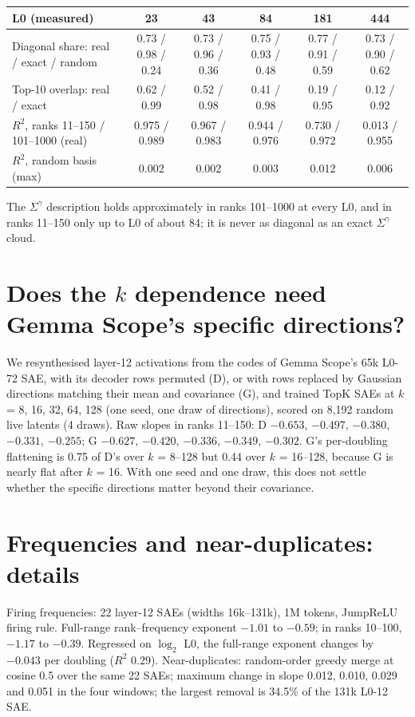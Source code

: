 \documentclass[10pt,twocolumn]{article}
\newcommand{\gam}{\gamma}
\begin{document}
\begin{center}
\small
\begin{tabular}{lccccc}
\toprule
L0 (measured) & 23 & 43 & 84 & 181 & 444 \\
\midrule
Diagonal share: real / exact / random & 0.73 / 0.98 / 0.24 & 0.73 / 0.96 / 0.36 & 0.75 / 0.93 / 0.48 & 0.77 / 0.91 / 0.59 & 0.73 / 0.90 / 0.62 \\
Top-10 overlap: real / exact & 0.62 / 0.99 & 0.52 / 0.98 & 0.41 / 0.98 & 0.19 / 0.95 & 0.12 / 0.92 \\
$R^2$, ranks 11--150 / 101--1000 (real) & 0.975 / 0.989 & 0.967 / 0.983 & 0.944 / 0.976 & 0.730 / 0.972 & 0.013 / 0.955 \\
$R^2$, random basis (max) & 0.002 & 0.002 & 0.003 & 0.012 & 0.006 \\
\bottomrule
\end{tabular}
\end{center}

The $\Sigma^{\gam}$ description holds approximately in ranks 101--1000 at every L0, and in ranks 11--150 only up to L0 of about 84; it is never as diagonal as an exact $\Sigma^{\gam}$ cloud.

\section{Does the \texorpdfstring{$k$}{k} dependence need Gemma Scope's specific directions?}
\label{app:control}

We resynthesised layer-12 activations from the codes of Gemma Scope's 65k L0-72 SAE, with its decoder rows permuted (D), or with rows replaced by Gaussian directions matching their mean and covariance (G), and trained TopK SAEs at $k$ = 8, 16, 32, 64, 128 (one seed, one draw of directions), scored on 8,192 random live latents (4 draws). Raw slopes in ranks 11--150: D $-0.653$, $-0.497$, $-0.380$, $-0.331$, $-0.255$; G $-0.627$, $-0.420$, $-0.336$, $-0.349$, $-0.302$. G's per-doubling flattening is 0.75 of D's over $k$ = 8--128 but 0.44 over $k$ = 16--128, because G is nearly flat after $k$ = 16. With one seed and one draw, this does not settle whether the specific directions matter beyond their covariance.

\section{Frequencies and near-duplicates: details}
\label{app:freq}

Firing frequencies: 22 layer-12 SAEs (widths 16k--131k), 1M tokens, JumpReLU firing rule. Full-range rank--frequency exponent $-1.01$ to $-0.59$; in ranks 10--100, $-1.17$ to $-0.39$. Regressed on $\log_2$ L0, the full-range exponent changes by $-0.043$ per doubling ($R^2$ 0.29). Near-duplicates: random-order greedy merge at cosine 0.5 over the same 22 SAEs; maximum change in slope 0.012, 0.010, 0.029 and 0.051 in the four windows; the largest removal is 34.5\% of the 131k L0-12 SAE.
\end{document}
